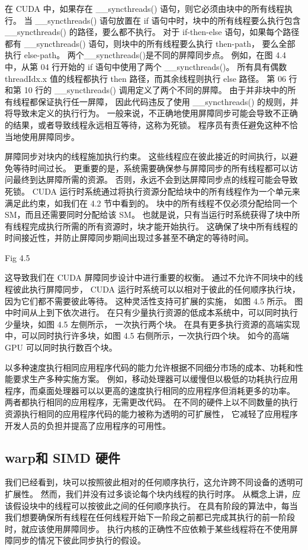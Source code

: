 在 CUDA 中，如果存在 \_\_syncthreads() 语句，则它必须由块中的所有线程执行。 
当 \_\_syncthreads() 语句放置在 if 语句中时，块中的所有线程要么执行包含 \_\_syncthreads() 的路径，要么都不执行。 
对于 if-then-else 语句，如果每个路径都有 \_\_syncthreads() 语句，则块中的所有线程要么执行 then-path，
要么全部执行 else-path。 两个\_\_syncthreads()是不同的屏障同步点。 
例如，在图 4.4 中，从第 04 行开始的 if 语句中使用了两个 \_\_syncthreads()。
所有具有偶数 threadIdx.x 值的线程都执行 then 路径，而其余线程则执行 else 路径。 
第 06 行和第 10 行的 \_\_syncthreads() 调用定义了两个不同的屏障。 由于并非块中的所有线程都保证执行任一屏障，
因此代码违反了使用 \_\_syncthreads() 的规则，并将导致未定义的执行行为。 
一般来说，不正确地使用屏障同步可能会导致不正确的结果，或者导致线程永远相互等待，这称为死锁。 
程序员有责任避免这种不恰当地使用屏障同步。

屏障同步对块内的线程施加执行约束。 这些线程应在彼此接近的时间执行，以避免等待时间过长。 
更重要的是，系统需要确保参与屏障同步的所有线程都可以访问最终到达屏障所需的资源。 
否则，永远不会到达屏障同步点的线程可能会导致死锁。 
CUDA 运行时系统通过将执行资源分配给块中的所有线程作为一个单元来满足此约束，如我们在 4.2 节中看到的。 
块中的所有线程不仅必须分配给同一个 SM，而且还需要同时分配给该 SM。 
也就是说，只有当运行时系统获得了块中所有线程完成执行所需的所有资源时，块才能开始执行。 
这确保了块中所有线程的时间接近性，并防止屏障同步期间出现过多甚至不确定的等待时间。

{\color{red} Fig 4.5}

这导致我们在 CUDA 屏障同步设计中进行重要的权衡。 通过不允许不同块中的线程彼此执行屏障同步，
CUDA 运行时系统可以以相对于彼此的任何顺序执行块，因为它们都不需要彼此等待。 这种灵活性支持可扩展的实施，
如图 4.5 所示。 图中时间从上到下依次进行。 在只有少量执行资源的低成本系统中，可以同时执行少量块，如图 4.5 左侧所示，
一次执行两个块。 在具有更多执行资源的高端实现中，可以同时执行许多块，如图 4.5 右侧所示，一次执行四个块。 
如今的高端 GPU 可以同时执行数百个块。

以多种速度执行相同应用程序代码的能力允许根据不同细分市场的成本、功耗和性能要求生产多种实施方案。 
例如，移动处理器可以缓慢但以极低的功耗执行应用程序，而桌面处理器可以以更高的速度执行相同的应用程序但消耗更多的功率。 
两者都执行相同的应用程序，无需更改代码。 
在不同的硬件上以不同数量的执行资源执行相同的应用程序代码的能力被称为透明的可扩展性，
它减轻了应用程序开发人员的负担并提高了应用程序的可用性。

\subsection{warp和 SIMD 硬件}
我们已经看到，块可以按照彼此相对的任何顺序执行，这允许跨不同设备的透明可扩展性。 
然而，我们并没有过多谈论每个块内线程的执行时序。 从概念上讲，应该假设块中的线程可以按彼此之间的任何顺序执行。 
在具有阶段的算法中，每当我们想要确保所有线程在任何线程开始下一阶段之前都已完成其执行的前一阶段时，就应该使用屏障同步。 
执行内核的正确性不应依赖于某些线程将在不使用屏障同步的情况下彼此同步执行的假设。

